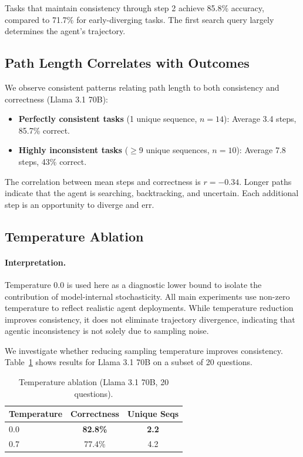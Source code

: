\documentclass{article}
\begin{document}
Tasks that maintain consistency through step 2 achieve 85.8\% accuracy, compared to 71.7\% for early-diverging tasks. The first search query largely determines the agent's trajectory.

\subsection{Path Length Correlates with Outcomes}

We observe consistent patterns relating path length to both consistency and correctness (Llama 3.1 70B):

\begin{itemize}
    \item \textbf{Perfectly consistent tasks} (1 unique sequence, $n=14$): Average 3.4 steps, 85.7\% correct.
    \item \textbf{Highly inconsistent tasks} ($\geq$9 unique sequences, $n=10$): Average 7.8 steps, 43\% correct.
\end{itemize}

The correlation between mean steps and correctness is $r = -0.34$. Longer paths indicate that the agent is searching, backtracking, and uncertain. Each additional step is an opportunity to diverge and err.

\subsection{Temperature Ablation}

\paragraph{Interpretation.}
Temperature 0.0 is used here as a diagnostic lower bound to isolate the contribution of model-internal stochasticity. All main experiments use non-zero temperature to reflect realistic agent deployments. While temperature reduction improves consistency, it does not eliminate trajectory divergence, indicating that agentic inconsistency is not solely due to sampling noise.

We investigate whether reducing sampling temperature improves consistency. Table~\ref{tab:temp} shows results for Llama 3.1 70B on a subset of 20 questions.

\begin{table}[h]
\centering
\caption{Temperature ablation (Llama 3.1 70B, 20 questions).}
\label{tab:temp}
\begin{tabular}{lcc}
\toprule
\textbf{Temperature} & \textbf{Correctness} & \textbf{Unique Seqs} \\
\midrule
0.0 & \textbf{82.8\%} & \textbf{2.2} \\
0.7 & 77.4\% & 4.2 \\
\bottomrule
\end{tabular}
\end{table}
\end{document}
